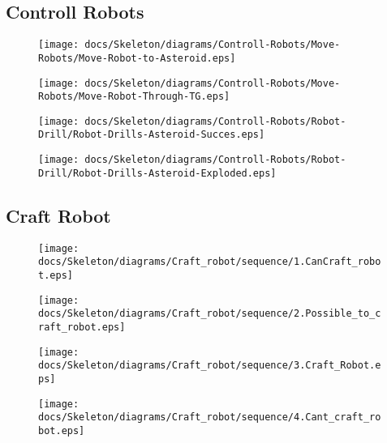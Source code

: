 
\subsection{Controll Robots}

\begin{figure}[H] 
    \centering 
    \texttt{[image: docs/Skeleton/diagrams/Controll-Robots/Move-Robots/Move-Robot-to-Asteroid.eps]} 
    \caption{} 
\end{figure} 

\begin{figure}[H] 
    \centering 
    \texttt{[image: docs/Skeleton/diagrams/Controll-Robots/Move-Robots/Move-Robot-Through-TG.eps]} 
    \caption{} 
\end{figure} 


\begin{figure}[H] 
    \centering 
    \texttt{[image: docs/Skeleton/diagrams/Controll-Robots/Robot-Drill/Robot-Drills-Asteroid-Succes.eps]} 
    \caption{} 
\end{figure} 

\begin{figure}[H] 
    \centering 
    \texttt{[image: docs/Skeleton/diagrams/Controll-Robots/Robot-Drill/Robot-Drills-Asteroid-Exploded.eps]} 
    \caption{} 
\end{figure} 

\subsection{Craft Robot}

\begin{figure}[H] 
    \centering 
    \texttt{[image: docs/Skeleton/diagrams/Craft\_robot/sequence/1.CanCraft\_robot.eps]} 
    \caption{} 
\end{figure} 

\begin{figure}[H] 
    \centering 
    \texttt{[image: docs/Skeleton/diagrams/Craft\_robot/sequence/2.Possible\_to\_craft\_robot.eps]} 
    \caption{} 
\end{figure} 

\begin{figure}[H] 
    \centering 
    \texttt{[image: docs/Skeleton/diagrams/Craft\_robot/sequence/3.Craft\_Robot.eps]} 
    \caption{} 
\end{figure} 

\begin{figure}[H] 
    \centering 
    \texttt{[image: docs/Skeleton/diagrams/Craft\_robot/sequence/4.Cant\_craft\_robot.eps]} 
    \caption{} 
\end{figure} 

